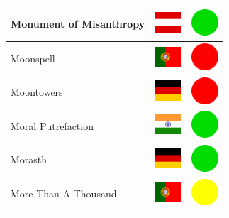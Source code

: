 \documentclass[12pt, a4paper, twoside]{report}
\begin{document}
\begin{center}
\begin{longtable}{|p{5cm}|p{2cm}|p{2cm}|}
Monument of Misanthropy & \includegraphics[width=1cm]{4x3/at} & \includegraphics[width=1cm]{likes/y} \\ \hline
Moonspell & \includegraphics[width=1cm]{4x3/pt} & \includegraphics[width=1cm]{likes/n} \\ \hline
Moontowers & \includegraphics[width=1cm]{4x3/de} & \includegraphics[width=1cm]{likes/n} \\ \hline
Moral Putrefaction & \includegraphics[width=1cm]{4x3/in} & \includegraphics[width=1cm]{likes/y} \\ \hline
Morasth & \includegraphics[width=1cm]{4x3/de} & \includegraphics[width=1cm]{likes/y} \\ \hline
More Than A Thousand & \includegraphics[width=1cm]{4x3/pt} & \includegraphics[width=1cm]{likes/m} \\ \hline

\end{longtable}
\end{center}
\end{document}
